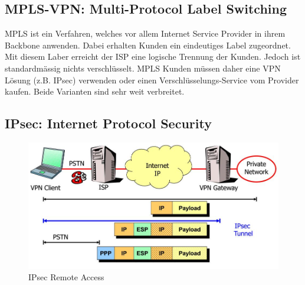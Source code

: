 \subsection{MPLS-VPN: Multi-Protocol Label Switching}
MPLS ist ein Verfahren, welches vor allem Internet Service Provider in ihrem Backbone anwenden. Dabei erhalten Kunden ein eindeutiges Label zugeordnet. Mit diesem Laber erreicht der ISP eine logische Trennung der Kunden. Jedoch ist standardmässig nichts verschlüsselt. MPLS Kunden müssen daher eine VPN Lösung (z.B. IPsec) verwenden oder einen Verschlüsselungs-Service vom Provider kaufen. Beide Varianten sind sehr weit verbreitet. 

\subsection{IPsec: Internet Protocol Security}\label{sec:ipsec-internet-protocol-security}
\begin{figure}[h]
\centering
\includegraphics[width=0.7\linewidth]{images/ipsec_remote_access}
\caption{IPsec Remote Access}
\label{fig:ipsecremoteaccess}
\end{figure}

